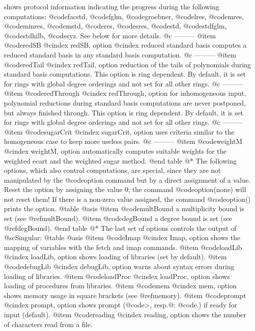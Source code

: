 {shows protocol information indicating the
progress during the following computations:
@code{facstd},
@code{fglm},
@code{groebner},
@code{lres},
@code{mres},
@code{minres},
@code{mstd},
@code{res},
@code{sres},
@code{std},
@code{stdfglm},
@code{stdhilb},
@code{syz}.
See below for more details.
@c ---------
@item @code{redSB}
@cindex redSB, option
@cindex reduced standard basis
computes a reduced standard basis in any standard basis computation.
@c ---------
@item @code{redTail}
@cindex redTail, option
reduction of the tails of polynomials during standard basis
computations. This option is ring dependent. By default, it is set for
rings with global degree orderings and not set for all other rings.
@c ---------
@item @code{redThrough}
@cindex redThrough, option
for inhomogeneous input, polynomial reductions during standard basis
computations are never postponed, but always finished through. This option
is ring   dependent. By default, it is set for rings with global degree
orderings and not set for all other rings.
@c ---------
@item @code{sugarCrit}
@cindex sugarCrit, option
uses criteria similar to the homogeneous case to keep more useless pairs.
@c ---------
@item @code{weightM}
@cindex weightM, option
automatically computes suitable weights for the weighted ecart and the
weighted sugar method.
@end table
@*
The following options, which also control computations, are special,
since they are not manipulated by the @code{option} command but by a
direct assignment of a value. Reset the option by assigning the value 0;
the command @code{option(none)} will not reset them! If there is a
non-zero value assigned, the command @code{option()} prints the option.
@table @asis
@item @code{multBound}
a multiplicity bound is set (see @ref{multBound}).
@item @code{degBound}
a degree bound is set (see @ref{degBound}).
@end table
@*
The last set of options controls the output of @sc{Singular}:
@table @asis
@item @code{Imap}
@cindex Imap, option
shows the mapping of variables with the fetch and imap commands.
@item @code{loadLib}
@cindex loadLib, option
shows loading of libraries (set by default).
@item @code{debugLib}
@cindex debugLib, option
warns about syntax errors during loading of libraries.
@item @code{loadProc}
@cindex loadProc, option
shows loading of procedures from libraries.
@item @code{mem}
@cindex mem, option
shows memory usage in square brackets (see @ref{memory}).
@item @code{prompt}
@cindex prompt, option
shows prompt (@code{>}, resp.@: @code{.}) if ready for input (default).
@item @code{reading}
@cindex reading, option
shows the number of characters read from a file.
}
